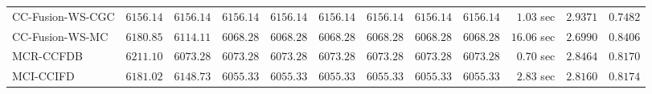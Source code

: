 \begin{table}[H]
\begin{tabular}{lrrrrrrrrrrr}
    CC-Fusion-WS-CGC & $      6156.14$ & $      6156.14$ & $      6156.14$ & $      6156.14$ & $      6156.14$ & $      6156.14$ & $      6156.14$ & $      6156.14$ & $         1.03$ sec    & $       2.9371$  & $       0.7482$ \\ 
     CC-Fusion-WS-MC & $      6180.85$ & $      6114.11$ & $      6068.28$ & $      6068.28$ & $      6068.28$ & $      6068.28$ & $      6068.28$ & $      6068.28$ & $        16.06$ sec    & $       2.6990$  & $       0.8406$ \\ 
\cmidrule{1-1} 
           MCR-CCFDB & $      6211.10$ & $      6073.28$ & $      6073.28$ & $      6073.28$ & $      6073.28$ & $      6073.28$ & $      6073.28$ & $      6073.28$ & $         0.70$ sec    & $       2.8464$  & $       0.8170$ \\ 
\cmidrule{1-1} 
           MCI-CCIFD & $      6181.02$ & $      6148.73$ & $      6055.33$ & $      6055.33$ & $      6055.33$ & $      6055.33$ & $      6055.33$ & $      6055.33$ & $         2.83$ sec    & $       2.8160$  & $       0.8174$ \\ 
\bottomrule
\end{tabular}
\end{table}

